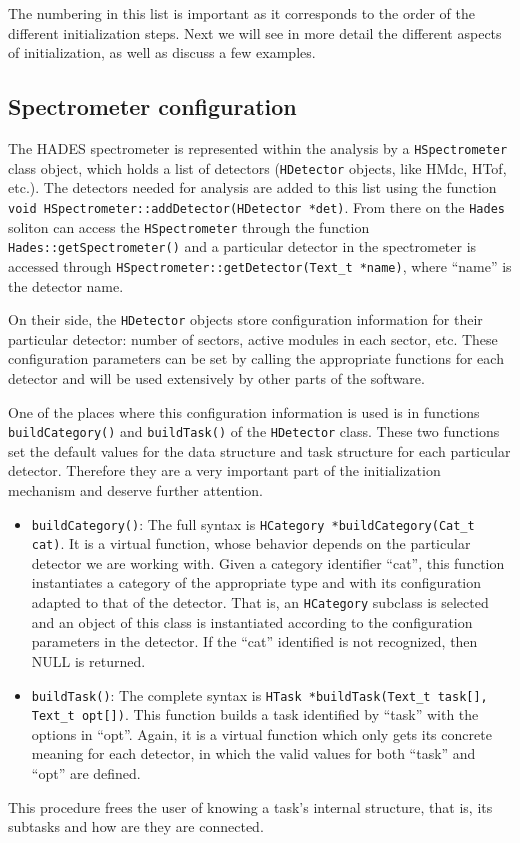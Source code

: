 The numbering in this list is important as it corresponds to the order of the different 
initialization steps. Next we will see in more detail the different aspects of initialization, 
as well as discuss a few examples.

\subsection{Spectrometer configuration}

The HADES spectrometer is represented within the analysis by a \verb+HSpectrometer+ 
class object, which holds a list of detectors (\verb+HDetector+ objects, like 
HMdc, HTof, etc.). The detectors needed for analysis are added to this list 
using the function 
\newline
\verb+void HSpectrometer::addDetector(HDetector *det)+. 
From there on the \verb+Hades+ soliton can access the \verb+HSpectrometer+ 
through the function 
\newline 
\verb+Hades::getSpectrometer()+ and a particular 
detector in the spectrometer is accessed through 
\verb+HSpectrometer::getDetector(Text_t *name)+, where ``name'' is the 
detector name.

On their side, the \verb+HDetector+ objects store configuration information 
for their particular detector: number of sectors, active modules in each sector, 
etc. These configuration parameters can be set by calling the appropriate 
functions for each detector and will be used extensively by other parts of 
the software.

One of the places where this configuration information is used is in functions 
\verb+buildCategory()+ and \verb+buildTask()+ of the \verb+HDetector+ class. 
These two functions set the default values for the data structure and task 
structure for each particular detector. Therefore they are a very important 
part of the initialization mechanism and deserve further attention.
\begin{itemize}
    \item \verb+buildCategory()+: The full syntax is \verb+HCategory *buildCategory(Cat_t cat)+. 
    It is a virtual function, whose behavior depends on the particular detector we 
    are working with. Given a category identifier ``cat'', this function instantiates 
    a category of the appropriate type and with its configuration adapted to that of 
    the detector. That is, an \verb+HCategory+ subclass is selected and an object of 
    this class is instantiated according to the configuration parameters in the detector. 
    If the ``cat'' identified is not recognized, then NULL is returned.
    \item \verb+buildTask()+: The complete syntax is 
    \newline
    \verb+HTask *buildTask(Text_t task[], Text_t opt[])+. 
    This function builds a task identified by ``task'' with the options in ``opt''. 
    Again, it is a virtual function which only gets its concrete meaning for each 
    detector, in which the valid values for both ``task'' and ``opt'' are defined.
\end{itemize}
This procedure frees the user of knowing a task's internal structure, that is, 
its subtasks and how are they are connected. 

